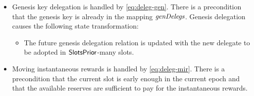 \begin{itemize}
  \item Genesis key delegation is handled by \cref{eq:deleg-gen}.
    There is a precondition that the genesis key is already in the mapping $\mathit{genDelegs}$.
    Genesis delegation causes the following state transformation:
    \begin{itemize}
      \item The future genesis delegation relation is updated with the new delegate
        to be adopted in $\mathsf{SlotsPrior}$-many slots.
      \end{itemize}

    \item  Moving instantaneous rewards is handled by \cref{eq:deleg-mir}. There
      is a precondition that the current slot is early enough in the current
      epoch and that the available reserves are sufficient to pay for the
      instantaneous rewards.
\end{itemize}



